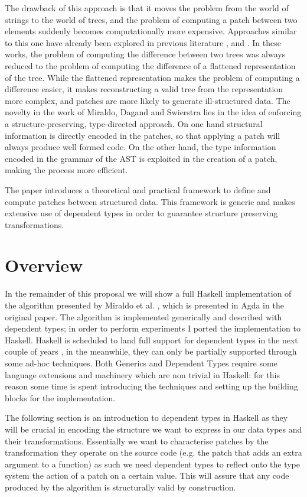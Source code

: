 \documentclass[11pt]{article}
\begin{document}
The drawback of this approach is that it moves the problem from the 
world of strings to the world of trees, and the problem of computing a patch between two elements suddenly
becomes computationally more expensive. 
Approaches similar to this one have already been explored in previous literature
\cite{semantics-VC}, \cite{structure-aware-VC} and \cite{vassena}. In these works, the problem of computing 
the difference between two trees was always reduced to the problem of computing the difference of a flattened
representation of the tree. While the flattened representation makes the problem of computing a difference 
easier,
it makes reconstructing a valid tree from the representation more complex, and patches are more likely to 
generate ill-structured data.  The novelty in the work of Miraldo, Dagand and Swierstra \cite{type-directed-diff} 
lies in the idea of enforcing a structure-preserving, type-directed approach. On 
one hand structural information is directly encoded in the patches, so that applying a patch will always produce well formed code. On 
the other hand, the type information encoded in the grammar of the AST is 
exploited in the creation of a patch, making the process more efficient.

The paper introduces a theoretical and practical framework to define and compute patches between 
structured data. This framework is generic and makes extensive use of dependent 
types in order to guarantee structure preserving transformations.

\section{Overview}\label{overview}
In the remainder of this proposal we will show a full Haskell implementation of the algorithm presented by Miraldo 
et al. \cite{type-directed-diff}, which is presented in Agda in the original paper. 
The algorithm is implemented generically and described with dependent types; in 
order to perform experiments I ported the implementation to Haskell. Haskell is scheduled to land full support 
for dependent types in the next couple of years \cite{dependent-haskell}, in the meanwhile, they can only 
be partially supported through some ad-hoc techniques. Both Generics and Dependent Types require some language 
extensions and machinery which are non trivial in Haskell: for this reason some time is spent introducing the
techniques and setting up the building blocks for the implementation. 

The following section is an introduction to dependent types in Haskell as they will be crucial in encoding 
the structure we want to express in our data types and their transformations. 
Essentially we want to characterise patches by the transformation they operate 
on the source code (e.g. the patch that adds an extra argument to a function) as 
such we need dependent types to reflect onto the type system the action of a 
patch on a certain value. This will assure that any code produced by the 
algorithm is structurally valid by construction.
\end{document}
